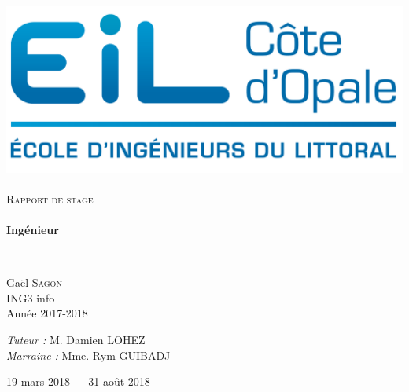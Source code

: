 \begin{titlepage}
  \begin{sffamily}
  \begin{center}

    \includegraphics[scale=0.9]{img/eilco.png}~\\[1.5cm]


    \textsc{\Large Rapport de stage}\\[1.5cm]

    \HRule \\[0.4cm]
    { \huge \bfseries Ingénieur\\[0.4cm] }

    \HRule \\[2cm]

    \begin{minipage}{0.4\textwidth}
      \begin{flushleft} \large
        Gaël \textsc{Sagon}\\
       ING3 info \\
       Année 2017-2018\\
      \end{flushleft}
    \end{minipage}
    \begin{minipage}{0.4\textwidth}
      \begin{flushright} \large
        \emph{Tuteur :} M. Damien LOHEZ\\
        \emph{Marraine : } Mme. Rym GUIBADJ
      \end{flushright}
    \end{minipage}

    \vfill

    {\large 19 mars 2018 — 31 août 2018}

  \end{center}
  \end{sffamily}
\end{titlepage}